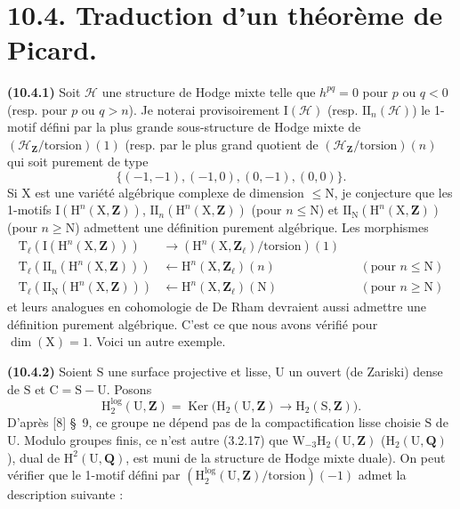 \documentclass[11pt,leqno]{article}
\newcommand{\Page}[1]{\ifvmode\noindent\else\unskip\ \fi{\footnotesize\textcolor{gray}{[p.\,#1]}}\ \ignorespaces}
\begin{document}
\Page{75}
\section*{10.4. Traduction d’un théorème de Picard.}

\textbf{(10.4.1)} Soit \(\mathcal{H}\) une structure de Hodge mixte telle que \(h^{pq}=0\) pour \(p\) ou \(q<0\) (resp. pour \(p\) ou \(q>n\)). Je noterai provisoirement \(\mathrm{I}(\mathcal{H})\) (resp. \(\mathrm{II}_n(\mathcal{H})\)) le 1-motif défini par la plus grande sous-structure de Hodge mixte de \((\mathcal{H}_{\mathbf{Z}}/\mathrm{torsion})(1)\) (resp. par le plus grand quotient de \((\mathcal{H}_{\mathbf{Z}}/\mathrm{torsion})(n)\) qui soit purement de type
\[
\{(-1,-1),(-1,0),(0,-1),(0,0)\}.
\]
Si \(\mathrm{X}\) est une variété algébrique complexe de dimension \(\leq\mathrm{N}\), je conjecture que les 1-motifs \(\mathrm{I}(\mathrm{H}^{n}(\mathrm{X},\mathbf{Z}))\), \(\mathrm{II}_n(\mathrm{H}^{n}(\mathrm{X},\mathbf{Z}))\) (pour \(n\leq\mathrm{N}\)) et \(\mathrm{II}_{\mathrm{N}}(\mathrm{H}^{n}(\mathrm{X},\mathbf{Z}))\) (pour \(n\geq\mathrm{N}\)) admettent une définition purement algébrique. Les morphismes
\[
\begin{aligned}
\mathrm{T}_{\ell}(\mathrm{I}(\mathrm{H}^{n}(\mathrm{X},\mathbf{Z})))
 &\longrightarrow
 (\mathrm{H}^{n}(\mathrm{X},\mathbf{Z}_{\ell})/\mathrm{torsion})(1)\\
\mathrm{T}_{\ell}(\mathrm{II}_n(\mathrm{H}^{n}(\mathrm{X},\mathbf{Z})))
 &\longleftarrow
 \mathrm{H}^{n}(\mathrm{X},\mathbf{Z}_{\ell})(n)
 &&(\text{pour }n\leq\mathrm{N})\\
\mathrm{T}_{\ell}(\mathrm{II}_{\mathrm{N}}(\mathrm{H}^{n}(\mathrm{X},\mathbf{Z})))
 &\longleftarrow
 \mathrm{H}^{n}(\mathrm{X},\mathbf{Z}_{\ell})(\mathrm{N})
 &&(\text{pour }n\geq\mathrm{N})
\end{aligned}
\]
et leurs analogues en cohomologie de De Rham devraient aussi admettre une définition purement algébrique. C’est ce que nous avons vérifié pour \(\dim(\mathrm{X})=1\). Voici un autre exemple.

\textbf{(10.4.2)} Soient \(\mathrm{S}\) une surface projective et lisse, \(\mathrm{U}\) un ouvert (de Zariski) dense de \(\mathrm{S}\) et \(\mathrm{C}=\mathrm{S}-\mathrm{U}\). Posons
\[
\mathrm{H}^{\log}_{2}(\mathrm{U},\mathbf{Z})
=\operatorname{Ker}\bigl(
\mathrm{H}_{2}(\mathrm{U},\mathbf{Z})
\to\mathrm{H}_{2}(\mathrm{S},\mathbf{Z})\bigr).
\]
D’après [8] \S~9, ce groupe ne dépend pas de la compactification lisse choisie \(\mathrm{S}\) de \(\mathrm{U}\). Modulo groupes finis, ce n’est autre (3.2.17) que \(\mathrm{W}_{-3}\mathrm{H}_{2}(\mathrm{U},\mathbf{Z})\) (\(\mathrm{H}_{2}(\mathrm{U},\mathbf{Q})\)), dual de \(\mathrm{H}^{2}(\mathrm{U},\mathbf{Q})\), est muni de la structure de Hodge mixte duale). On peut vérifier que le 1-motif défini par \((\mathrm{H}^{\log}_{2}(\mathrm{U},\mathbf{Z})/\mathrm{torsion})(-1)\) admet la description suivante :
\end{document}
